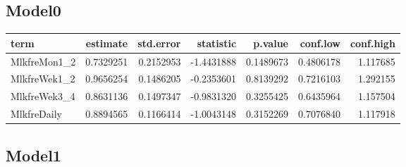 \documentclass[]{article}
\newenvironment{Shaded}{\begin{snugshade}}{\end{snugshade}}
\newcommand{\DataTypeTok}[1]{\textcolor[rgb]{0.13,0.29,0.53}{#1}}
\newcommand{\KeywordTok}[1]{\textcolor[rgb]{0.13,0.29,0.53}{\textbf{#1}}}
\newcommand{\NormalTok}[1]{#1}
\newcommand{\OperatorTok}[1]{\textcolor[rgb]{0.81,0.36,0.00}{\textbf{#1}}}
\newcommand{\OtherTok}[1]{\textcolor[rgb]{0.56,0.35,0.01}{#1}}
\newcommand{\StringTok}[1]{\textcolor[rgb]{0.31,0.60,0.02}{#1}}
\begin{document}
\hypertarget{model0-3}{%
\subsection{Model0}\label{model0-3}}

\begin{Shaded}
\end{Shaded}

\begin{longtable}[]{@{}lrrrrrr@{}}
\toprule
term & estimate & std.error & statistic & p.value & conf.low &
conf.high\tabularnewline
\midrule
\endhead
MlkfreMon1\_2 & 0.7329251 & 0.2152953 & -1.4431888 & 0.1489673 &
0.4806178 & 1.117685\tabularnewline
MlkfreWek1\_2 & 0.9656254 & 0.1486205 & -0.2353601 & 0.8139292 &
0.7216103 & 1.292155\tabularnewline
MlkfreWek3\_4 & 0.8631136 & 0.1497347 & -0.9831320 & 0.3255425 &
0.6435964 & 1.157504\tabularnewline
MlkfreDaily & 0.8894565 & 0.1166414 & -1.0043148 & 0.3152269 & 0.7076840
& 1.117918\tabularnewline
\bottomrule
\end{longtable}

\hypertarget{model1-3}{%
\subsection{Model1}\label{model1-3}}

\begin{Shaded}
\end{Shaded}
\end{document}
